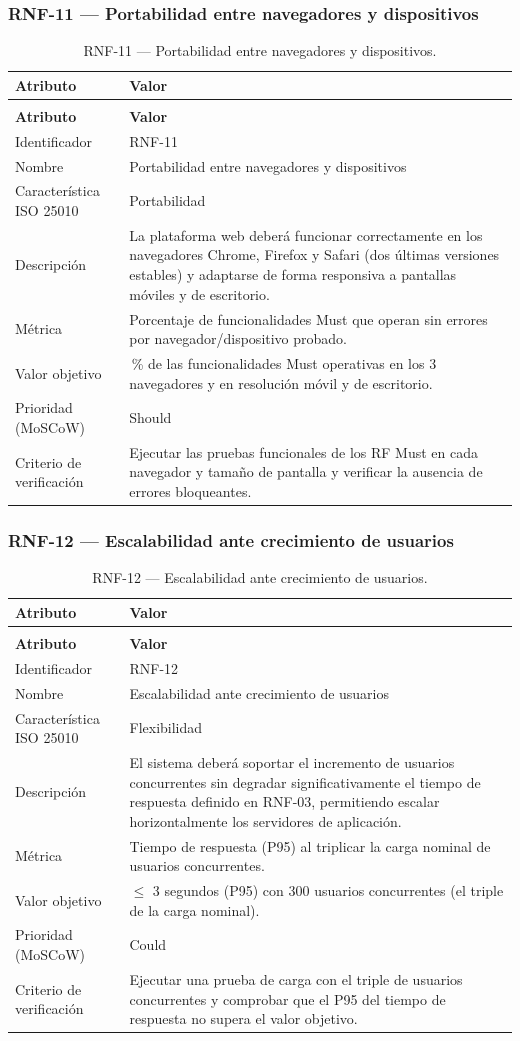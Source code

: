 \documentclass[journal,onecolumn]{IEEEtran}
\makeatletter
\newenvironment{atributos}[2]{%
	\small
	\begin{longtable}{@{}>{\raggedright\arraybackslash}p{4.2cm} >{\raggedright\arraybackslash}p{11.2cm}@{}}
		\caption{#2}\label{tab:#1}\\
		\toprule
		\textbf{Atributo} & \textbf{Valor} \\
		\midrule
		\endfirsthead
		\multicolumn{2}{@{}l}{\small\itshape (continuación)}\\
		\toprule
		\textbf{Atributo} & \textbf{Valor} \\
		\midrule
		\endhead
		\bottomrule
		\endlastfoot
	}{%
	\end{longtable}
	\normalsize
}
\makeatother
\begin{document}
	\subsubsection{RNF-11 --- Portabilidad entre navegadores y dispositivos}
	
	\begin{atributos}{RNF-11}{RNF-11 --- Portabilidad entre navegadores y dispositivos.}
		Identificador & RNF-11 \\
		Nombre & Portabilidad entre navegadores y dispositivos \\
		Característica ISO 25010 & Portabilidad \\
		Descripción & La plataforma web deberá funcionar correctamente en los navegadores Chrome, Firefox y Safari (dos últimas versiones estables) y adaptarse de forma responsiva a pantallas móviles y de escritorio. \\
		Métrica & Porcentaje de funcionalidades Must que operan sin errores por navegador/dispositivo probado. \\
		Valor objetivo & 100\,\% de las funcionalidades Must operativas en los 3 navegadores y en resolución móvil y de escritorio. \\
		Prioridad (MoSCoW) & Should \\
		Criterio de verificación & Ejecutar las pruebas funcionales de los RF Must en cada navegador y tamaño de pantalla y verificar la ausencia de errores bloqueantes. \\
	\end{atributos}
	
	\subsubsection{RNF-12 --- Escalabilidad ante crecimiento de usuarios}
	
	\begin{atributos}{RNF-12}{RNF-12 --- Escalabilidad ante crecimiento de usuarios.}
		Identificador & RNF-12 \\
		Nombre & Escalabilidad ante crecimiento de usuarios \\
		Característica ISO 25010 & Flexibilidad \\
		Descripción & El sistema deberá soportar el incremento de usuarios concurrentes sin degradar significativamente el tiempo de respuesta definido en RNF-03, permitiendo escalar horizontalmente los servidores de aplicación. \\
		Métrica & Tiempo de respuesta (P95) al triplicar la carga nominal de usuarios concurrentes. \\
		Valor objetivo & $\leq$ 3 segundos (P95) con 300 usuarios concurrentes (el triple de la carga nominal). \\
		Prioridad (MoSCoW) & Could \\
		Criterio de verificación & Ejecutar una prueba de carga con el triple de usuarios concurrentes y comprobar que el P95 del tiempo de respuesta no supera el valor objetivo. \\
	\end{atributos}
	
\end{document}
